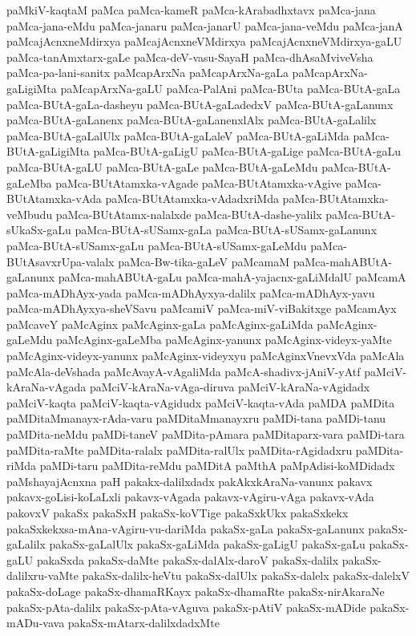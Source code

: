 {paMkiV-kaqtaM
paMca
paMca-kameR
paMca-kArabadhxtavx
paMca-jana
paMca-jana-eMdu
paMca-janaru
paMca-janarU
paMca-jana-veMdu
paMca-janA
paMcajAcnxneMdirxya
paMcajAcnxneVMdirxya
paMcajAcnxneVMdirxya-gaLU
paMca-tanAmxtarx-gaLe
paMca-deV-vasu-SayaH
paMca-dhAsaMviveVsha
paMca-pa-lani-sanitx
paMcapArxNa
paMcapArxNa-gaLa
paMcapArxNa-gaLigiMta
paMcapArxNa-gaLU
paMca-PalAni
paMca-BUta
paMca-BUtA-gaLa
paMca-BUtA-gaLa-dasheyu
paMca-BUtA-gaLadedxV
paMca-BUtA-gaLanunx
paMca-BUtA-gaLanenx
paMca-BUtA-gaLanenxlAlx
paMca-BUtA-gaLalilx
paMca-BUtA-gaLalUlx
paMca-BUtA-gaLaleV
paMca-BUtA-gaLiMda
paMca-BUtA-gaLigiMta
paMca-BUtA-gaLigU
paMca-BUtA-gaLige
paMca-BUtA-gaLu
paMca-BUtA-gaLU
paMca-BUtA-gaLe
paMca-BUtA-gaLeMdu
paMca-BUtA-gaLeMba
paMca-BUtAtamxka-vAgade
paMca-BUtAtamxka-vAgive
paMca-BUtAtamxka-vAda
paMca-BUtAtamxka-vAdadxriMda
paMca-BUtAtamxka-veMbudu
paMca-BUtAtamx-nalalxde
paMca-BUtA-dashe-yalilx
paMca-BUtA-sUkaSx-gaLu
paMca-BUtA-sUSamx-gaLa
paMca-BUtA-sUSamx-gaLanunx
paMca-BUtA-sUSamx-gaLu
paMca-BUtA-sUSamx-gaLeMdu
paMca-BUtAsavxrUpa-valalx
paMca-Bw-tika-gaLeV
paMcamaM
paMca-mahABUtA-gaLanunx
paMca-mahABUtA-gaLu
paMca-mahA-yajacnx-gaLiMdalU
paMcamA
paMca-mADhAyx-yada
paMca-mADhAyxya-dalilx
paMca-mADhAyx-yavu
paMca-mADhAyxya-sheVSavu
paMcamiV
paMca-miV-viBakitxge
paMcamAyx
paMcaveY
paMcAginx
paMcAginx-gaLa
paMcAginx-gaLiMda
paMcAginx-gaLeMdu
paMcAginx-gaLeMba
paMcAginx-yanunx
paMcAginx-videyx-yaMte
paMcAginx-videyx-yanunx
paMcAginx-videyxyu
paMcAginxVnevxVda
paMcAla
paMcAla-deVshada
paMcAvayA-vAgaliMda
paMcA-shadivx-jAniV-yAtf
paMciV-kAraNa-vAgada
paMciV-kAraNa-vAga-diruva
paMciV-kAraNa-vAgidadx
paMciV-kaqta
paMciV-kaqta-vAgidudx
paMciV-kaqta-vAda
paMDA
paMDita
paMDitaMmanayx-rAda-varu
paMDitaMmanayxru
paMDi-tana
paMDi-tanu
paMDita-neMdu
paMDi-taneV
paMDita-pAmara
paMDitaparx-vara
paMDi-tara
paMDita-raMte
paMDita-ralalx
paMDita-ralUlx
paMDita-rAgidadxru
paMDita-riMda
paMDi-taru
paMDita-reMdu
paMDitA
paMthA
paMpAdisi-koMDidadx
paMshayajAcnxna
paH
pakakx-dalilxdadx
pakAkxkAraNa-vanunx
pakavx
pakavx-goLisi-koLaLxli
pakavx-vAgada
pakavx-vAgiru-vAga
pakavx-vAda
pakovxV
pakaSx
pakaSxH
pakaSx-koVTige
pakaSxkUkx
pakaSxkekx
pakaSxkekxsa-mAna-vAgiru-vu-dariMda
pakaSx-gaLa
pakaSx-gaLanunx
pakaSx-gaLalilx
pakaSx-gaLalUlx
pakaSx-gaLiMda
pakaSx-gaLigU
pakaSx-gaLu
pakaSx-gaLU
pakaSxda
pakaSx-daMte
pakaSx-dalAlx-daroV
pakaSx-dalilx
pakaSx-dalilxru-vaMte
pakaSx-dalilx-heVtu
pakaSx-dalUlx
pakaSx-dalelx
pakaSx-dalelxV
pakaSx-doLage
pakaSx-dhamaRKayx
pakaSx-dhamaRte
pakaSx-nirAkaraNe
pakaSx-pAta-dalilx
pakaSx-pAta-vAguva
pakaSx-pAtiV
pakaSx-mADide
pakaSx-mADu-vava
pakaSx-mAtarx-dalilxdadxMte
}
